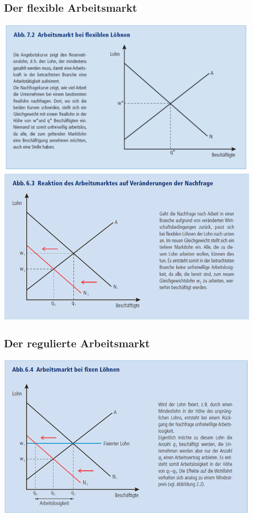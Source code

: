 \subsection{Der flexible Arbeitsmarkt}
\begin{multicols}{2}
	\includegraphics[width=0.95\linewidth]{images/felxibellohne.png}
	\includegraphics[width=0.95\linewidth]{images/flexibellohne2.png}
\end{multicols}
\subsection{Der regulierte Arbeitsmarkt}
	\includegraphics[width=0.8\linewidth]{images/fixelohne.png}

